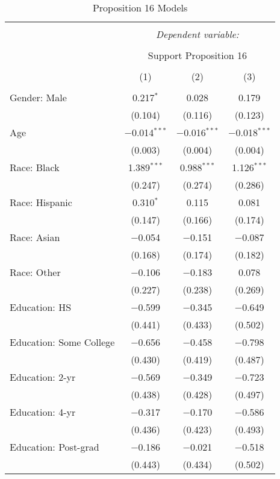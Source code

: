 
\begin{table}[!htbp] \centering 
  \caption{Proposition 16 Models} 
  \label{tab:reg_prop16_long} 
\footnotesize 
\begin{tabular}{@{\extracolsep{5pt}}lccc} 
\\[-1.8ex]\hline 
\hline \\[-1.8ex] 
 & \multicolumn{3}{c}{\textit{Dependent variable:}} \\ 
\cline{2-4} 
\\[-1.8ex] & \multicolumn{3}{c}{Support Proposition 16} \\ 
\\[-1.8ex] & (1) & (2) & (3)\\ 
\hline \\[-1.8ex] 
 Gender: Male & 0.217$^{*}$ & 0.028 & 0.179 \\ 
  & (0.104) & (0.116) & (0.123) \\ 
  Age & $-$0.014$^{***}$ & $-$0.016$^{***}$ & $-$0.018$^{***}$ \\ 
  & (0.003) & (0.004) & (0.004) \\ 
  Race: Black & 1.389$^{***}$ & 0.988$^{***}$ & 1.126$^{***}$ \\ 
  & (0.247) & (0.274) & (0.286) \\ 
  Race: Hispanic & 0.310$^{*}$ & 0.115 & 0.081 \\ 
  & (0.147) & (0.166) & (0.174) \\ 
  Race: Asian & $-$0.054 & $-$0.151 & $-$0.087 \\ 
  & (0.168) & (0.174) & (0.182) \\ 
  Race: Other & $-$0.106 & $-$0.183 & 0.078 \\ 
  & (0.227) & (0.238) & (0.269) \\ 
  Education: HS & $-$0.599 & $-$0.345 & $-$0.649 \\ 
  & (0.441) & (0.433) & (0.502) \\ 
  Education: Some College & $-$0.656 & $-$0.458 & $-$0.798 \\ 
  & (0.430) & (0.419) & (0.487) \\ 
  Education: 2-yr & $-$0.569 & $-$0.349 & $-$0.723 \\ 
  & (0.438) & (0.428) & (0.497) \\ 
  Education: 4-yr & $-$0.317 & $-$0.170 & $-$0.586 \\ 
  & (0.436) & (0.423) & (0.493) \\ 
  Education: Post-grad & $-$0.186 & $-$0.021 & $-$0.518 \\ 
  & (0.443) & (0.434) & (0.502) \\ 

\end{tabular}
\end{table}
